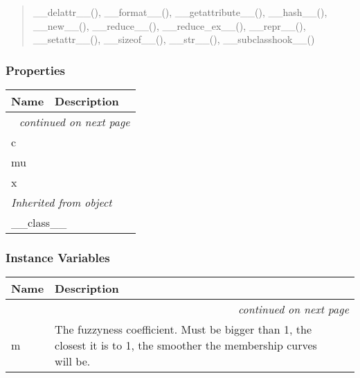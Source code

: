 \begin{quote}
\_\_delattr\_\_(), \_\_format\_\_(), \_\_getattribute\_\_(), \_\_hash\_\_(), \_\_new\_\_(), \_\_reduce\_\_(), \_\_reduce\_ex\_\_(), \_\_repr\_\_(), \_\_setattr\_\_(), \_\_sizeof\_\_(), \_\_str\_\_(), \_\_subclasshook\_\_()
\end{quote}


  \subsubsection{Properties}

    \vspace{-1cm}
\hspace{\varindent}\begin{longtable}{|p{\varnamewidth}|p{\vardescrwidth}|l}
\cline{1-2}
\cline{1-2} \centering \textbf{Name} & \centering \textbf{Description}& \\
\cline{1-2}
\endhead\cline{1-2}\multicolumn{3}{r}{\small\textit{continued on next page}}\\\endfoot\cline{1-2}
\endlastfoot\raggedright c\- & &\\
\cline{1-2}
\raggedright m\-u\- & &\\
\cline{1-2}
\raggedright x\- & &\\
\cline{1-2}
\multicolumn{2}{|l|}{\textit{Inherited from object}}\\
\multicolumn{2}{|p{\varwidth}|}{\raggedright \_\_class\_\_}\\
\cline{1-2}
\end{longtable}



  \subsubsection{Instance Variables}

    \vspace{-1cm}
\hspace{\varindent}\begin{longtable}{|p{\varnamewidth}|p{\vardescrwidth}|l}
\cline{1-2}
\cline{1-2} \centering \textbf{Name} & \centering \textbf{Description}& \\
\cline{1-2}
\endhead\cline{1-2}\multicolumn{3}{r}{\small\textit{continued on next page}}\\\endfoot\cline{1-2}
\endlastfoot\raggedright m\- & The fuzzyness coefficient. Must be bigger than 1, the closest it is
to 1, the smoother the membership curves will be.&\\
\cline{1-2}
\end{longtable}

